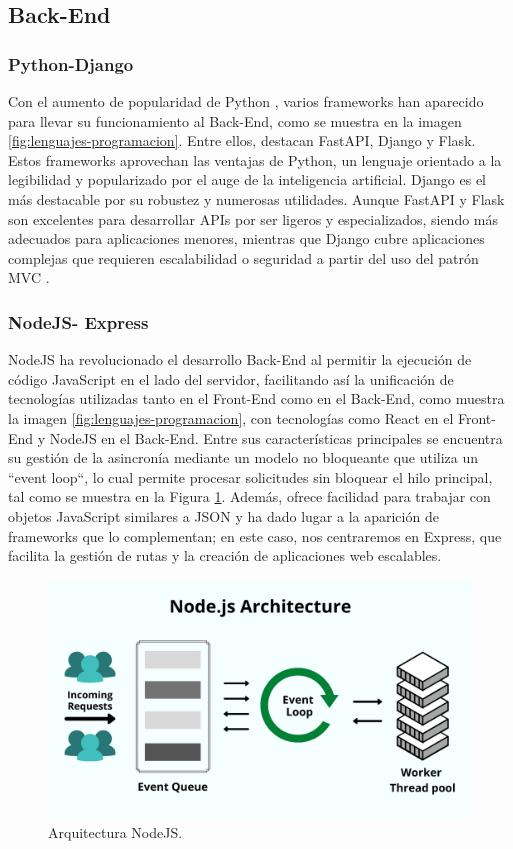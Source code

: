 \subsection{Back-End}
\subsubsection*{Python-Django}
Con el aumento de popularidad de Python \cite{Top_Language_GitHub}, varios frameworks han aparecido para llevar su funcionamiento al Back-End, como se muestra en la imagen \ref{fig:lenguajes-programacion}. Entre ellos, destacan FastAPI, Django y Flask. Estos frameworks aprovechan las ventajas de Python, un lenguaje orientado a la legibilidad y popularizado por el auge de la inteligencia artificial. Django es el más destacable por su robustez y numerosas utilidades. Aunque FastAPI y Flask son excelentes para desarrollar APIs por ser ligeros y especializados, siendo más adecuados para aplicaciones menores, mientras que Django cubre aplicaciones complejas que requieren escalabilidad o seguridad a partir del uso del patrón MVC \cite{MVC}.

\subsubsection*{NodeJS- Express}
NodeJS\cite{NodeJS} ha revolucionado el desarrollo Back-End al permitir la ejecución de código JavaScript en el lado del servidor, facilitando así la unificación de tecnologías utilizadas tanto en el Front-End como en el Back-End, como muestra la imagen \ref{fig:lenguajes-programacion}, con tecnologías como React en el Front-End y NodeJS en el Back-End. Entre sus características principales se encuentra su gestión de la asincronía mediante un modelo no bloqueante que utiliza un ``event loop``, lo cual permite procesar solicitudes sin bloquear el hilo principal, tal como se muestra en la Figura \ref{fig:nodejs}. Además, ofrece facilidad para trabajar con objetos JavaScript similares a JSON y ha dado lugar a la aparición de frameworks que lo complementan; en este caso, nos centraremos en Express, que facilita la gestión de rutas y la creación de aplicaciones web escalables.
\begin{figure}[H]
    \centering
    \includegraphics[width=1\textwidth]{fotos/node-js2.png}
    \caption{Arquitectura NodeJS\textbf{}.}
    \label{fig:nodejs}
\end{figure}
